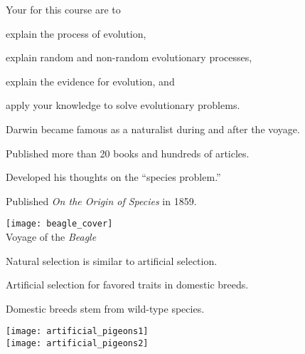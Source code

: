 \documentclass[t]{beamer}
\begin{document}

\begin{frame}[t]{Your  for this course are to}
	
	\hangpara explain the process of evolution, 
	
	\hangpara explain random and non-random evolutionary processes,
	
	\hangpara explain the evidence for evolution, and
	
	\hangpara apply your knowledge to solve evolutionary problems.
	
\end{frame}




{
	\begin{frame}[t]
\end{frame}
}

{
\begin{frame}[t]{}
\end{frame}
}

{
\begin{frame}[t]{Darwin became famous as a naturalist during and after the voyage.}

\begin{multicols}{2}

\hangpara Published more than 20 books and hundreds of articles.

\hangpara Developed his thoughts on the “species problem.”

\hangpara Published \textit{On the Origin of Species} in 1859.

\columnbreak

\centering
\texttt{[image: beagle\_cover]}\\
Voyage of the \textit{Beagle}

\end{multicols}

\end{frame}
}

{
\begin{frame}[t]{Natural selection is similar to artificial selection.}
	
	\begin{multicols}{2}
		
		\hangpara Artificial selection for favored traits in domestic breeds.
		
		\hangpara Domestic breeds stem from wild-type species.
				
		\columnbreak
		
		\centering
		\texttt{[image: artificial\_pigeons1]}\\
		\texttt{[image: artificial\_pigeons2]}
		
	\end{multicols}
	
\end{frame}
}
\end{document}
